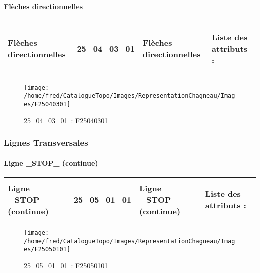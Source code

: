 \documentclass[12pt,titlepage,oneside]{book}
\begin{document}
\paragraph{Flèches directionnelles}
\noindent
\vspace{\baselineskip}

\renewcommand{\arraystretch}{1.2}
\begin{supertabular}{|p{10cm}|c|p{13cm}|p{12cm}|}
 Flèches directionnelles & 25\_04\_03\_01 & Flèches directionnelles & Liste des attributs :
\begin{enumerate}
\end{enumerate}
\\
\hline
\end{supertabular}
\begin{figure}[h!]
  \hfill         %
  \begin{minipage}[t]{3cm}
    \begin{center}
      \texttt{[image: /home/fred/CatalogueTopo/Images/RepresentationChagneau/Images/F25040301]}
      \caption[~25\_04\_03\_01]{\small{25\_04\_03\_01~:} \tiny{F25040301}}\label{F25040301}
    \end{center}
  \end{minipage}
\end{figure}

\subsubsection{\large Lignes Transversales}
\paragraph{Ligne \_STOP\_ (continue)}
\noindent
\vspace{\baselineskip}

\renewcommand{\arraystretch}{1.2}
\begin{supertabular}{|p{10cm}|c|p{13cm}|p{12cm}|}
 Ligne \_STOP\_ (continue) & 25\_05\_01\_01 & Ligne \_STOP\_ (continue) & Liste des attributs :
\begin{enumerate}
\end{enumerate}
\\
\hline
\end{supertabular}
\begin{figure}[h!]
  \hfill         %
  \begin{minipage}[t]{3cm}
    \begin{center}
      \texttt{[image: /home/fred/CatalogueTopo/Images/RepresentationChagneau/Images/F25050101]}
      \caption[~25\_05\_01\_01]{\small{25\_05\_01\_01~:} \tiny{F25050101}}\label{F25050101}
    \end{center}
  \end{minipage}
\end{figure}
\end{document}
